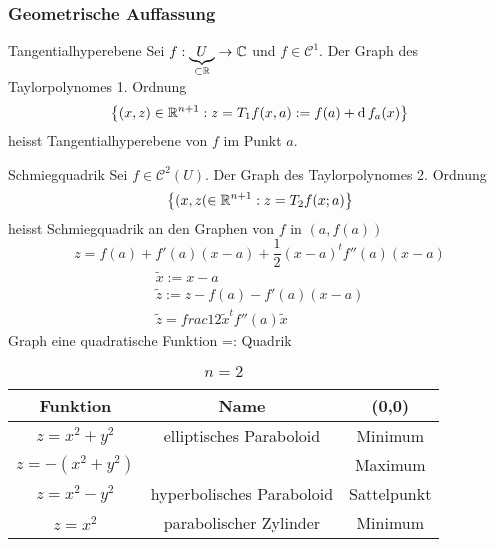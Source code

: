 \subsubsection{Geometrische Auffassung}
\begin{Def}{Tangentialhyperebene}
  Sei $f:\underbrace{U}_{\subset\mathbb{R}}\to \mathbb{C}$ und $f\in\mathcal{C}^1$. Der Graph des Taylorpolynomes 1. Ordnung
  \[\left\{ (x,z)\in\mathbb{R}^{n+1}:z=T_1f(x,a):=f(a)+\operatorname{d} f_a(x) \right\}\]
  heisst Tangentialhyperebene von $f$ im Punkt $a$.
\end{Def}
\begin{Def}{Schmiegquadrik}
  Sei $f\in\mathcal{C}^2(U)$. Der Graph des Taylorpolynomes 2. Ordnung
  \[\left\{ (x,z(\in\mathbb{R}^{n+1}:z=T_2f(x;a) \right\}\]
  heisst Schmiegquadrik an den Graphen von $f$ in $\left( a,f(a) \right)$
  \[z=f(a)+f'(a)(x-a)+\frac{1}{2}(x-a)^tf''(a)(x-a)\]
  \begin{gather*}
    \tilde x:=x-a\\
    \tilde z:=z-f(a)-f'(a)(x-a)\\
    \tilde z=frac{1}{2}\tilde x^tf''(a)\tilde x
  \end{gather*}
  Graph eine quadratische Funktion =: Quadrik
\end{Def}
\begin{Bsp}
  \begin{table}
    \centering
    \begin{tabular}{c|c|c}
      Funktion&Name&(0,0)\\
      \hline
      $z=x^2+y^2$& elliptisches Paraboloid&Minimum\\
      $z=-(x^2+y^2)$&&Maximum\\
      \hline
      $z=x^2-y^2$&hyperbolisches Paraboloid&Sattelpunkt\\
      \hline
      $z=x^2$&parabolischer Zylinder&Minimum
    \end{tabular}
    \caption{$n=2$}
  \end{table}
\end{Bsp}
